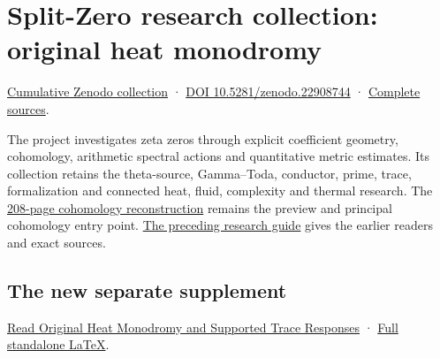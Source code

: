 \documentclass[
]{article}
\author{}
\date{}
\begin{document}
\section{Split-Zero research collection: original heat
monodromy}\label{split-zero-research-collection-original-heat-monodromy}

\href{https://zenodo.org/records/22908744}{Cumulative Zenodo collection}
· \href{https://doi.org/10.5281/zenodo.22908744}{DOI
10.5281/zenodo.22908744} ·
\href{https://zenodo.org/records/22908744/files/163-splitzero-integral-monodromy-complete-sources.zip?download=1}{Complete
sources}.

The project investigates zeta zeros through explicit coefficient
geometry, cohomology, arithmetic spectral actions and quantitative
metric estimates. Its collection retains the theta-source, Gamma--Toda,
conductor, prime, trace, formalization and connected heat, fluid,
complexity and thermal research. The
\href{https://zenodo.org/records/22908744/files/154-splitzero-full-support-graph-pulses.pdf?download=1}{208-page
cohomology reconstruction} remains the preview and principal cohomology
entry point.
\href{https://github.com/KokunoYumeto/zeta-function-research-reader/blob/ffffbe41d458728cbdda0c6e32702ff2c1a8fce0/workbenches/splitzero-tandem/continuations/20260923-prism-holonomy-publication/README.md}{The
preceding research guide} gives the earlier readers and exact sources.

\subsection{The new separate
supplement}\label{the-new-separate-supplement}

\href{https://zenodo.org/records/22908744/files/162-splitzero-original-heat-monodromy.pdf?download=1}{Read
Original Heat Monodromy and Supported Trace Responses} ·
\href{https://github.com/KokunoYumeto/zeta-function-research-reader/blob/54635658c374977ea4390f4d34bf412dfc9c155d/workbenches/splitzero-tandem/continuations/20260923-original-heat-integral-monodromy/ORIGINAL_HEAT_MONODROMY_AND_TRACE_RESPONSES.tex}{Full
standalone LaTeX}.
\end{document}
